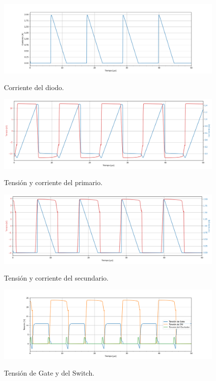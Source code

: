 \begin{figure}[H]
	\centering
	\includegraphics[width=\linewidth]{ImagenesParteII/Idiodo.png}
	\label{fig:idiodo}
	\caption{Corriente del diodo.}
\end{figure}

\begin{figure}[H]
	\centering
	\includegraphics[width=0.9\linewidth]{ImagenesParteII/Primario.png}
	\label{fig:primario}
	\caption{Tensión y corriente del primario.}
\end{figure}

\begin{figure}[H]
	\centering
	\includegraphics[width=0.9\linewidth]{ImagenesParteII/Secundario.png}
	\label{fig:secundario}
	\caption{Tensión y corriente del secundario.}
\end{figure}

\begin{figure}[H]
	\centering
	\includegraphics[width=\linewidth]{ImagenesParteII/TensionesVarias1.png}
	\label{fig:tensionesvarias}
	\caption{Tensión de Gate y del Switch.}
\end{figure}

